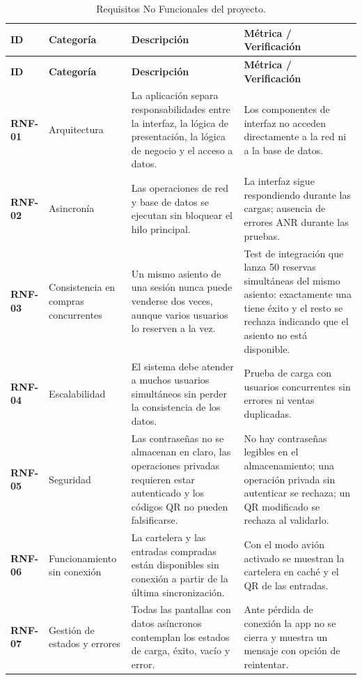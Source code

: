 \documentclass[11pt,a4paper]{article}
\begin{document}
\begin{longtable}{L{1.7cm} L{2.4cm} L{6.0cm} L{4.0cm}}
\caption{Requisitos No Funcionales del proyecto.}\\
\toprule
\textbf{ID} & \textbf{Categoría} & \textbf{Descripción} & \textbf{Métrica / Verificación} \\
\midrule
\endfirsthead
\toprule
\textbf{ID} & \textbf{Categoría} & \textbf{Descripción} & \textbf{Métrica / Verificación} \\
\midrule
\endhead
\endfoot
\bottomrule
\endlastfoot

\textbf{RNF-01} & Arquitectura & La aplicación separa responsabilidades entre la interfaz, la lógica de presentación, la lógica de negocio y el acceso a datos. & Los componentes de interfaz no acceden directamente a la red ni a la base de datos. \\
\midrule
\textbf{RNF-02} & Asincronía & Las operaciones de red y base de datos se ejecutan sin bloquear el hilo principal. & La interfaz sigue respondiendo durante las cargas; ausencia de errores ANR durante las pruebas. \\
\midrule
\textbf{RNF-03} & Consistencia en compras concurrentes & Un mismo asiento de una sesión nunca puede venderse dos veces, aunque varios usuarios lo reserven a la vez. & Test de integración que lanza 50 reservas simultáneas del mismo asiento: exactamente una tiene éxito y el resto se rechaza indicando que el asiento no está disponible. \\
\midrule
\textbf{RNF-04} & Escalabilidad & El sistema debe atender a muchos usuarios simultáneos sin perder la consistencia de los datos. & Prueba de carga con usuarios concurrentes sin errores ni ventas duplicadas. \\
\midrule
\textbf{RNF-05} & Seguridad & Las contraseñas no se almacenan en claro, las operaciones privadas requieren estar autenticado y los códigos QR no pueden falsificarse. & No hay contraseñas legibles en el almacenamiento; una operación privada sin autenticar se rechaza; un QR modificado se rechaza al validarlo. \\
\midrule
\textbf{RNF-06} & \hspace{0pt}Funcionamiento sin conexión & La cartelera y las entradas compradas están disponibles sin conexión a partir de la última sincronización. & Con el modo avión activado se muestran la cartelera en caché y el QR de las entradas. \\
\midrule
\textbf{RNF-07} & Gestión de estados y errores & Todas las pantallas con datos asíncronos contemplan los estados de carga, éxito, vacío y error. & Ante pérdida de conexión la app no se cierra y muestra un mensaje con opción de reintentar. \\

\end{longtable}
\end{document}
